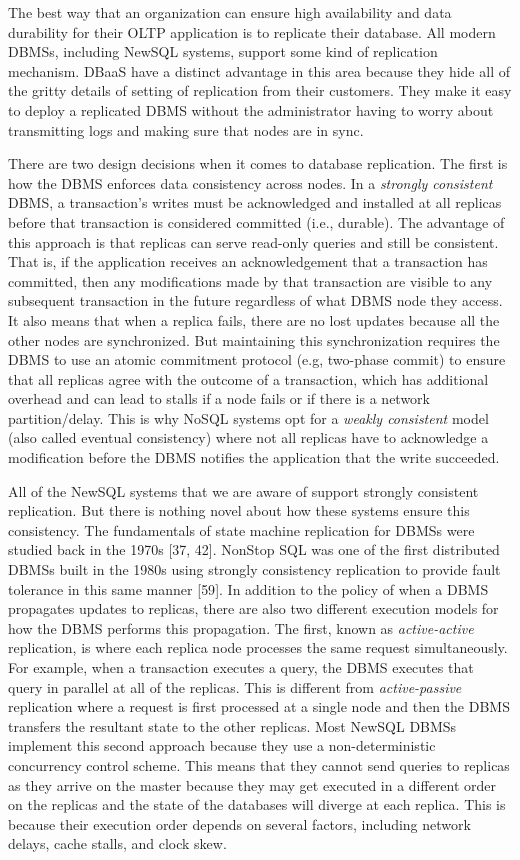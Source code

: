 \documentclass[a4paper,12pt,notitlepage,twoside,openright]{article}
\begin{document}
The best way that an organization can ensure high availability and data
durability for their OLTP application is to replicate their database.
All modern DBMSs, including NewSQL systems, support some kind of
replication mechanism. DBaaS have a distinct advantage in this area
because they hide all of the gritty details of setting of replication
from their customers. They make it easy to deploy a replicated DBMS
without the administrator having to worry about transmitting logs and
making sure that nodes are in sync.

There are two design decisions when it comes to database replication.
The first is how the DBMS enforces data consistency across nodes. In a
\emph{strongly consistent} DBMS, a transaction's writes must be
acknowledged and installed at all replicas before that transaction is
considered committed (i.e., durable). The advantage of this approach is
that replicas can serve read-only queries and still be consistent. That
is, if the application receives an acknowledgement that a transaction
has committed, then any modifications made by that transaction are
visible to any subsequent transaction in the future regardless of what
DBMS node they access. It also means that when a replica fails, there
are no lost updates because all the other nodes are synchronized. But
maintaining this synchronization requires the DBMS to use an atomic
commitment protocol (e.g, two-phase commit) to ensure that all replicas
agree with the outcome of a transaction, which has additional overhead
and can lead to stalls if a node fails or if there is a network
partition/delay. This is why NoSQL systems opt for a \emph{weakly
consistent} model (also called eventual consistency) where not all
replicas have to acknowledge a modification before the DBMS notifies the
application that the write succeeded.

All of the NewSQL systems that we are aware of support strongly
consistent replication. But there is nothing novel about how these
systems ensure this consistency. The fundamentals of state machine
replication for DBMSs were studied back in the 1970s {[}37, 42{]}.
NonStop SQL was one of the first distributed DBMSs built in the 1980s
using strongly consistency replication to provide fault tolerance in
this same manner {[}59{]}. In addition to the policy of when a DBMS
propagates updates to replicas, there are also two different execution
models for how the DBMS performs this propagation. The first, known as
\emph{active-active} replication, is where each replica node processes
the same request simultaneously. For example, when a transaction
executes a query, the DBMS executes that query in parallel at all of the
replicas. This is different from \emph{active-passive} replication where
a request is first processed at a single node and then the DBMS
transfers the resultant state to the other replicas. Most NewSQL DBMSs
implement this second approach because they use a non-deterministic
concurrency control scheme. This means that they cannot send queries to
replicas as they arrive on the master because they may get executed in a
different order on the replicas and the state of the databases will
diverge at each replica. This is because their execution order depends
on several factors, including network delays, cache stalls, and clock
skew.
\end{document}
